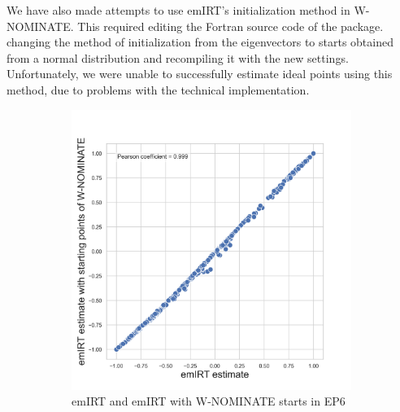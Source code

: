 \documentclass[a4paper,12pt]{report}
\begin{document}
                We have also made attempts to use emIRT's initialization method in W-NOMINATE. This required editing the
                Fortran
                source code of the package.
                changing the method of initialization from the eigenvectors to starts obtained from a
                normal distribution and recompiling it with the new settings.
                Unfortunately, we were unable to successfully
                estimate ideal points using this method, due to problems with the technical implementation.
                \begin{figure}[H]
                    \centering
                    \begin{subfigure}[b]{0.48\textwidth}
                        \centering
                        \includegraphics[width=\textwidth]{Graphs/ScatterEMEIGEN6}
                        \caption{emIRT and emIRT with W-NOMINATE starts in EP6}
                        \label{fig:EMEIGEN_SCATTER_6}
                    \end{subfigure}
                    \hfill
                    \begin{subfigure}[b]{0.48\textwidth}
                        \centering

\end{subfigure}
\end{figure}
\end{document}
